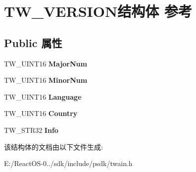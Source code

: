 \hypertarget{struct_t_w___v_e_r_s_i_o_n}{}\section{T\+W\+\_\+\+V\+E\+R\+S\+I\+O\+N结构体 参考}
\label{struct_t_w___v_e_r_s_i_o_n}
\subsection*{Public 属性}
\begin{DoxyCompactItemize}
\item 
\mbox{\label{struct_t_w___v_e_r_s_i_o_n_ac4ec890be816d72ef467051ff1311b56}} 
T\+W\+\_\+\+U\+I\+N\+T16 {\bfseries Major\+Num}
\item 
\mbox{\label{struct_t_w___v_e_r_s_i_o_n_ac32695e203ddde0fb57641ebfbd44f3b}} 
T\+W\+\_\+\+U\+I\+N\+T16 {\bfseries Minor\+Num}
\item 
\mbox{\label{struct_t_w___v_e_r_s_i_o_n_a3311ff0744530f1a1ce4509db02f337b}} 
T\+W\+\_\+\+U\+I\+N\+T16 {\bfseries Language}
\item 
\mbox{\label{struct_t_w___v_e_r_s_i_o_n_a81ad73f442b6d07d84e66974da78559c}} 
T\+W\+\_\+\+U\+I\+N\+T16 {\bfseries Country}
\item 
\mbox{\label{struct_t_w___v_e_r_s_i_o_n_ae3b0e8dc68f117970304113c657932fb}} 
T\+W\+\_\+\+S\+T\+R32 {\bfseries Info}
\end{DoxyCompactItemize}


该结构体的文档由以下文件生成\+:\begin{DoxyCompactItemize}
\item 
E\+:/\+React\+O\+S-\/0../sdk/include/psdk/twain.\+h\end{DoxyCompactItemize}
